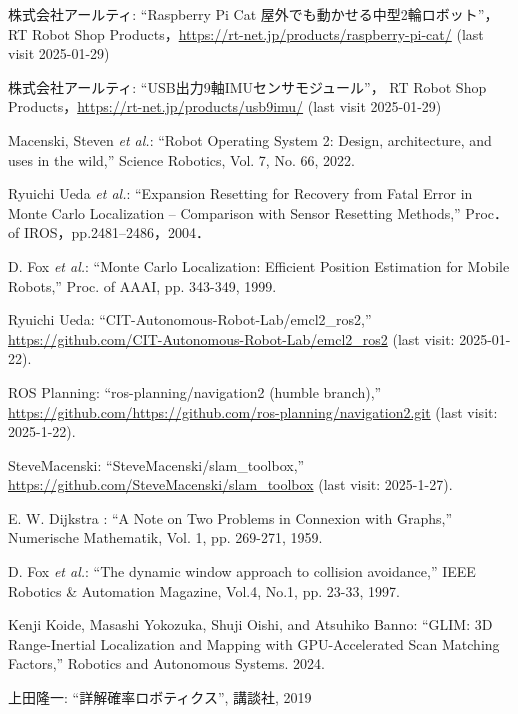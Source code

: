 \documentclass[twocolumn,9pt]{jsproceedings}
\begin{document}
\footnotesize
\begin{thebibliography}{99}

  株式会社アールティ: ``Raspberry Pi Cat 屋外でも動かせる中型2輪ロボット''，
  RT Robot Shop Products，\url{https://rt-net.jp/products/raspberry-pi-cat/} (last visit 2025-01-29)
  
  株式会社アールティ: ``USB出力9軸IMUセンサモジュール''，
  RT Robot Shop Products，\url{https://rt-net.jp/products/usb9imu/} (last visit 2025-01-29)

  Macenski, Steven {\it et al.}: ``Robot Operating System 2: Design, architecture, and uses in the wild,''
  Science Robotics, Vol. 7, No. 66, 2022.

  Ryuichi Ueda {\it et al.}: 
  ``Expansion Resetting for Recovery from Fatal Error in Monte Carlo Localization -- Comparison with Sensor Resetting Methods,'' Proc．of IROS，pp.2481--2486，2004．
  
  D. Fox {\it et al.}: ``Monte Carlo Localization: Efficient Position Estimation for Mobile Robots,''
  Proc. of AAAI, pp. 343-349, 1999.
  
  Ryuichi Ueda: ``CIT-Autonomous-Robot-Lab/emcl2\_ros2,'' \url{https://github.com/CIT-Autonomous-Robot-Lab/emcl2_ros2} (last visit: 2025-01-22).
  
  ROS Planning: ``ros-planning/navigation2 (humble branch),'' \url{https://github.com/https://github.com/ros-planning/navigation2.git} (last visit: 2025-1-22).

  SteveMacenski: ``SteveMacenski/slam\_toolbox,'' \url{https://github.com/SteveMacenski/slam_toolbox} (last visit: 2025-1-27).

  E. W. Dijkstra : ``A Note on Two Problems in Connexion with Graphs,''
  Numerische Mathematik, Vol. 1, pp. 269-271, 1959.

	D. Fox {\it et al.}: ``The dynamic window approach to collision avoidance,'' 
	IEEE Robotics \& Automation Magazine, Vol.4, No.1, pp. 23-33, 1997.

  Kenji Koide, Masashi Yokozuka, Shuji Oishi, and Atsuhiko Banno: ``GLIM: 3D Range-Inertial Localization and Mapping with GPU-Accelerated Scan Matching Factors,''
  Robotics and Autonomous Systems. 2024.

    上田隆一: ``詳解確率ロボティクス'', 講談社, 2019


\end{thebibliography}
\end{document}
